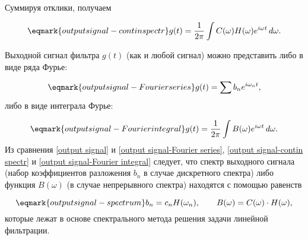 \begin{enumerate}
Суммируя отклики, получаем

\begin{equation}
    \eqmark{output signal-contin spectr}
    g(t)=\frac{1}{2\pi}\int C(\omega)H(\omega)e^{i\omega t}\,d\omega.
\end{equation}

Выходной сигнал фильтра $g(t)$ (как и любой сигнал) можно представить либо в
виде ряда Фурье:

\begin{equation}
    \eqmark{output signal-Fourier series}
    g(t)=\sum b_n e^{i\omega_n t},
\end{equation}
либо в виде интеграла Фурье:

\begin{equation}
    \eqmark{output signal-Fourier integral}
    g(t)=\frac{1}{2\pi}\int B(\omega)e^{i\omega t}\,d\omega.
\end{equation}
Из сравнения \eqref{output signal} и \eqref{output signal-Fourier series},
\eqref{output signal-contin spectr} и \eqref{output signal-Fourier integral}
следует, что спектр выходного сигнала (набор коэффициентов
разложения $b_n$ в случае дискретного спектра) либо функция $B(\omega)$ (в
случае непрерывного спектра) находятся с
помощью равенств

\begin{equation}
    \eqmark{output signal-spectrum}
    b_n=c_n H(\omega_n),\qquad B(\omega)=C(\omega)\cdot H(\omega),
\end{equation}
которые лежат в основе спектрального метода решения задачи линейной фильтрации.
\end{enumerate}



